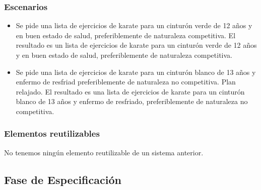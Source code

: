 \documentclass[12pt,a4paper,twoside,spanish]{article}      %
\begin{document}
\subsubsection{Escenarios}
\begin{itemize}
\item Se pide una lista de ejercicios de karate para un cinturón verde de 12 años y en buen estado de salud, preferiblemente de naturaleza competitiva. El resultado es un lista de ejercicios de karate para un cinturón verde de 12 años y en buen estado de salud, preferiblemente de naturaleza competitiva.
  \item Se pide una lista de ejercicios de karate para un cinturón blanco de 13 años y enfermo de resfriad preferiblemente de naturaleza no competitiva. Plan relajado. El resultado es una lista de ejercicios de karate para un cinturón blanco de 13 años y enfermo de resfriado, preferiblemente de naturaleza no competitiva.

\end{itemize}
\subsubsection{Elementos reutilizables}
  No tenemos ningún elemento reutilizable de un sistema anterior.
\subsection{Fase de Especificación}

%
%
\end{document}
